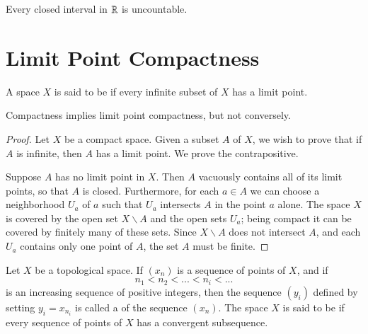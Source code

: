 \documentclass[12pt, a4paper, oneside, openright, titlepage]{book}
\begin{document}
\begin{corollary}
    Every closed interval in $\mathbb R$ is uncountable.
\end{corollary}


\section{Limit Point Compactness}

\begin{definition}
    A space $X$ is said to be  if every infinite subset of $X$ has a limit point.
\end{definition}

\begin{theorem}
    Compactness implies limit point compactness, but not conversely.
\end{theorem}
\begin{proof}
    Let $X$ be a compact space. Given a subset $A$ of $X$, we wish to prove that if $A$ is infinite, then $A$ has a limit point. We prove the contrapositive.

    Suppose $A$ has no limit point in $X$. Then $A$ vacuously contains all of its limit points, so that $A$ is closed. Furthermore, for each $a \in A$ we can choose a neighborhood $U_a$ of $a$ such that $U_a$ intersects $A$ in the point $a$ alone. The space $X$ is covered by the open set $X\backslash A$ and the open sets $U_a$; being compact it can be covered by finitely many of these sets. Since $X\backslash A$ does not intersect $A$, and each $U_a$ contains only one point of $A$, the set $A$ must be finite.
\end{proof}


\begin{definition}
    Let $X$ be a topological space. If $(x_n)$ is a sequence of points of $X$, and if \begin{equation*}
        n_1 < n_2 < ... < n_i < ...
    \end{equation*}
    is an increasing sequence of positive integers, then the sequence $(y_i)$ defined by setting $y_i = x_{n_i}$ is called a  of the sequence $(x_n)$. The space $X$ is said to be  if every sequence of points of $X$ has a convergent subsequence.
\end{definition}
\end{document}
